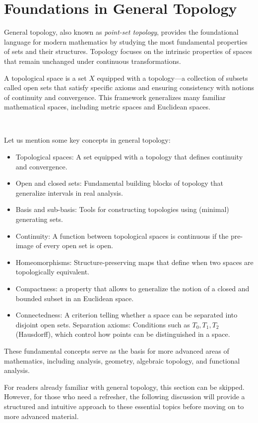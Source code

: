

\chapter{Foundations in General Topology}
General topology, also known as \emph{point-set topology}, provides the foundational language for modern mathematics by studying the most fundamental properties of sets and their structures. Topology focuses on the intrinsic properties of spaces that remain unchanged under continuous transformations.

A topological space is a set 
$X$ equipped with a topology—a collection of subsets called open sets that satisfy specific axioms and ensuring consistency with notions of continuity and convergence. This framework generalizes many familiar mathematical spaces, including metric spaces and Euclidean spaces.

\, 

Let us mention some key concepts in general topology:

\begin{itemize}
\item Topological spaces: A set equipped with a topology that defines continuity and convergence.
\item Open and closed sets: Fundamental building blocks of topology that generalize intervals in real analysis.
\item Basis and sub-basis: Tools for constructing topologies using (minimal) generating sets.
\item Continuity: A function between topological spaces is continuous if the pre-image of every open set is open.
\item Homeomorphisms: Structure-preserving maps that define when two spaces are topologically equivalent.
\item Compactness: a property that allows to generalize the notion of a closed and bounded subset in an Euclidean space. 
\item Connectedness: A criterion telling whether a space can be separated into disjoint open sets.
Separation axioms: Conditions such as $T_0,T_1,T_2$ (Hausdorff), which control how points can be distinguished in a space.
  \end{itemize}
  
These fundamental concepts serve as the basis for more advanced areas of mathematics, including analysis, geometry, algebraic topology, and functional analysis.

For readers already familiar with general topology, this section can be skipped. However, for those who need a refresher, the following discussion will provide a structured and intuitive approach to these essential topics before moving on to more advanced material.

